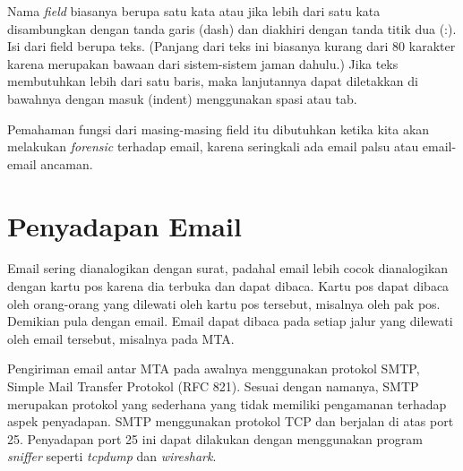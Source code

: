 Nama {\em field} biasanya berupa satu kata atau jika lebih dari satu kata
disambungkan dengan tanda garis (dash) dan diakhiri dengan tanda titik dua (:).
Isi dari field berupa teks. (Panjang dari teks ini biasanya kurang dari 80
karakter karena merupakan bawaan dari sistem-sistem jaman dahulu.) Jika teks
membutuhkan lebih dari satu baris, maka lanjutannya dapat diletakkan di
bawahnya dengan masuk (indent) menggunakan spasi atau tab.

Pemahaman fungsi dari masing-masing field itu dibutuhkan ketika kita akan
melakukan {\em forensic} terhadap email, karena seringkali ada email palsu atau
email-email ancaman.

\section{Penyadapan Email}
Email sering dianalogikan dengan surat, padahal email lebih cocok dianalogikan
dengan kartu pos karena dia terbuka dan dapat dibaca. Kartu pos dapat dibaca
oleh orang-orang yang dilewati oleh kartu pos tersebut, misalnya oleh pak pos.
Demikian pula dengan email. Email dapat dibaca pada setiap jalur yang dilewati
oleh email tersebut, misalnya pada MTA.

Pengiriman email antar MTA pada awalnya menggunakan protokol SMTP, Simple Mail
Transfer Protokol (RFC 821). Sesuai dengan namanya, SMTP merupakan protokol
yang sederhana yang tidak memiliki pengamanan terhadap aspek penyadapan. SMTP
menggunakan protokol TCP dan berjalan di atas port 25. Penyadapan port 25 ini
dapat dilakukan dengan menggunakan program {\em sniffer} seperti {\em tcpdump}
dan {\em wireshark}.
